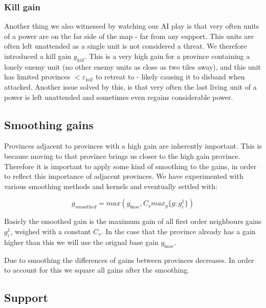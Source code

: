 \documentclass[a4paper]{article} %
\begin{document}
\subsubsection{Kill gain}
\label{sec:killgain}
Another thing we also witnessed by watching our AI play is that very often units of a power are on the far side of the map - far from any support. This units are often left unattended as a single unit is not considered a threat. We therefore introduced a kill gain $g_{kill}$. This is a very high gain for a province containing a lonely enemy unit (no other enemy units as close as two tiles away), and this unit has limited provinces $< \varepsilon_{kill}$ to retreat to - likely causing it to disband when attacked. 
Another issue solved by this, is that very often the last living unit of a power is left unattended and sometimes even regains considerable power. 

\subsection{Smoothing gains}
Provinces adjacent to provinces with a high gain are inherently important. This is because moving to that province brings us closer to the high gain province. Therefore it is important to apply some kind of smoothing to the gains, in order to reflect this importance of adjacent provinces. We have experimented with various smoothing methods and kernels and eventually settled with: 

$$g_{smoothed} = max(g_{base}, C_{s} max_{g}\{g : g^1_i\})$$

Basicly the smoothed gain is the maximum gain of all first order neighbours gains $g^1_i$, weighed with a constant $C_s$. In the case that the province already has a gain higher than this we will use the orignal base gain $g_{base}$. 

Due to smoothing the differences of gains between provinces decreases. In order to account for this we square all gains after the smoothing. 


\subsection{Support}
\end{document}
